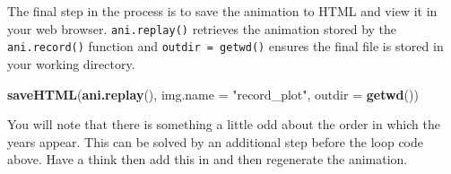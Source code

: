 \documentclass[]{article}
\newenvironment{Shaded}{}{}
\newcommand{\KeywordTok}[1]{\textcolor[rgb]{0.00,0.44,0.13}{\textbf{{#1}}}}
\newcommand{\DataTypeTok}[1]{\textcolor[rgb]{0.56,0.13,0.00}{{#1}}}
\newcommand{\DecValTok}[1]{\textcolor[rgb]{0.25,0.63,0.44}{{#1}}}
\newcommand{\FloatTok}[1]{\textcolor[rgb]{0.25,0.63,0.44}{{#1}}}
\newcommand{\StringTok}[1]{\textcolor[rgb]{0.25,0.44,0.63}{{#1}}}
\newcommand{\NormalTok}[1]{{#1}}
\begin{document}
\begin{Shaded}
\end{Shaded}
The final step in the process is to save the animation to HTML and view
it in your web browser. \texttt{ani.replay()} retrieves the animation
stored by the \texttt{ani.record()} function and
\texttt{outdir = getwd()} ensures the final file is stored in your
working directory.

\begin{Shaded}
\begin{Highlighting}[]
\KeywordTok{saveHTML}\NormalTok{(}\KeywordTok{ani.replay}\NormalTok{(), }\DataTypeTok{img.name =} \StringTok{"record_plot"}\NormalTok{, }\DataTypeTok{outdir =} \KeywordTok{getwd}\NormalTok{())}
\end{Highlighting}
\end{Shaded}
You will note that there is something a little odd about the order in
which the years appear. This can be solved by an additional step before
the loop code above. Have a think then add this in and then regenerate
the animation.
\end{document}
